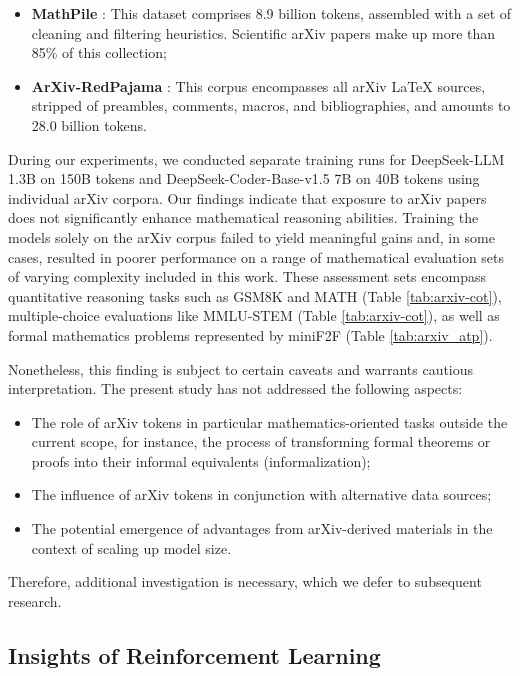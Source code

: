 \begin{itemize}[topsep=0pt]
\begin{itemize}[topsep=0pt]
    \item \textbf{MathPile} \citep{mathpile}: This dataset comprises 8.9 billion tokens, assembled with a set of cleaning and filtering heuristics. Scientific arXiv papers make up more than 85\% of this collection;
    \item \textbf{ArXiv-RedPajama} \citep{redpajama}: This corpus encompasses all arXiv LaTeX sources, stripped of preambles, comments, macros, and bibliographies, and amounts to 28.0 billion tokens.
\end{itemize}

During our experiments, we conducted separate training runs for DeepSeek-LLM 1.3B on 150B tokens and DeepSeek-Coder-Base-v1.5 7B on 40B tokens using individual arXiv corpora. Our findings indicate that exposure to arXiv papers does not significantly enhance mathematical reasoning abilities. Training the models solely on the arXiv corpus failed to yield meaningful gains and, in some cases, resulted in poorer performance on a range of mathematical evaluation sets of varying complexity included in this work. These assessment sets encompass quantitative reasoning tasks such as GSM8K and MATH (Table \ref{tab:arxiv-cot}), multiple-choice evaluations like MMLU-STEM (Table \ref{tab:arxiv-cot}), as well as formal mathematics problems represented by miniF2F (Table \ref{tab:arxiv_atp}).

Nonetheless, this finding is subject to certain caveats and warrants cautious interpretation. The present study has not addressed the following aspects:

\begin{itemize}[topsep=0pt]
    \item The role of arXiv tokens in particular mathematics-oriented tasks outside the current scope, for instance, the process of transforming formal theorems or proofs into their informal equivalents (informalization);
    \item The influence of arXiv tokens in conjunction with alternative data sources;
    \item The potential emergence of advantages from arXiv-derived materials in the context of scaling up model size.
\end{itemize}

Therefore, additional investigation is necessary, which we defer to subsequent research.

\subsection{Insights of Reinforcement Learning}

\end{itemize}
